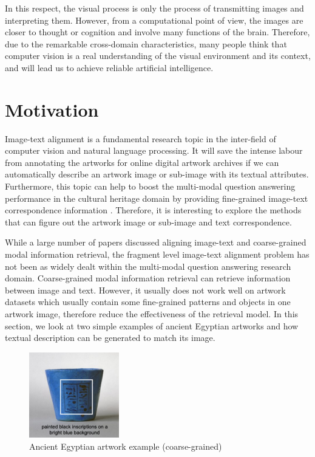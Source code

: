In this respect, the visual process is only the process of transmitting images and interpreting them. However, from a computational point of view, the images are closer to thought or cognition and involve many functions of the brain. Therefore, due to the remarkable cross-domain characteristics, many people think that computer vision is a real understanding of the visual environment and its context, and will lead us to achieve reliable artificial intelligence.

\section{Motivation}
Image-text alignment is a fundamental research topic in the inter-field of computer vision and natural language processing. It will save the intense labour from annotating the artworks for online
digital artwork archives if we can automatically describe an artwork image or sub-image with its textual attributes. Furthermore, this topic can help to boost the multi-modal question answering performance in the cultural heritage domain by providing fine-grained image-text correspondence information \cite{mqa}. Therefore, it is interesting to explore the methods that can figure out the artwork image or sub-image and text correspondence.

While a large number of papers discussed aligning image-text and coarse-grained modal information retrieval, the fragment level image-text alignment problem has not been as widely dealt within the multi-modal question answering research domain. Coarse-grained modal information retrieval can retrieve information between image and text. However, it usually does not work well on artwork datasets which usually contain some fine-grained patterns and objects in one artwork image, therefore reduce the effectiveness of the retrieval model. In this section, we look at two simple examples of ancient Egyptian artworks and how textual description can be generated to match its image.

\begin{figure}[h!]
\centering
\includegraphics[width=0.35\textwidth]{artwork_fine1.pdf}
\caption{Ancient Egyptian artwork example (coarse-grained)}
\label{fig:artwork1}
\end{figure}

